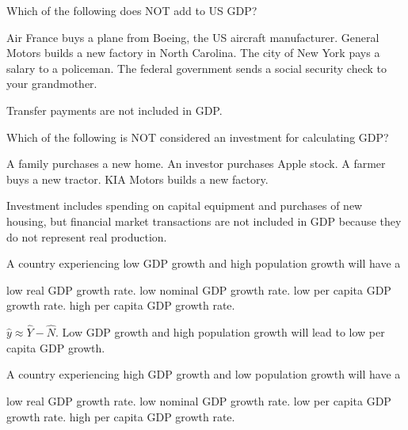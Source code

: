 \documentclass[addpoints,11pt]{exam}
\theoremstyle{definition}
\begin{document}
\begin{questions}

		\question Which of the following does NOT add to US GDP?
		
		\begin{choices}
			\choice Air France buys a plane from Boeing, the US aircraft manufacturer.
			\choice General Motors builds a new factory in North Carolina.
			\choice The city of New York pays a salary to a policeman.
			\CorrectChoice The federal government sends a social security check to your grandmother.
		\end{choices}
		
		\begin{solution}
			Transfer payments are not included in GDP.
		\end{solution}
	
\newpage
		
		\question Which of the following is NOT considered an investment for calculating GDP?
		
		\begin{choices}
			\choice A family purchases a new home.
			\CorrectChoice An investor purchases Apple stock.
			\choice A farmer buys a new tractor.
			\choice KIA Motors builds a new factory.
		\end{choices}
		
		\begin{solution}
			Investment includes spending on capital equipment and purchases of new housing, but financial market transactions are not included in GDP because they do not represent real production.
		\end{solution}
		
		\question A country experiencing low GDP growth and high population growth will have a
		
		\begin{choices}
			\choice low real GDP growth rate.
			\choice low nominal GDP growth rate.
			\CorrectChoice low per capita GDP growth rate.
			\choice high per capita GDP growth rate.
		\end{choices}
		
		\begin{solution}
			$\hat{y} \approx \hat{Y} - \hat{N}$. Low GDP growth and high population growth will lead to low per capita GDP growth.
		\end{solution}

	\question A country experiencing high GDP growth and low population growth will have a
	
	\begin{choices}
		\choice low real GDP growth rate.
		\choice low nominal GDP growth rate.
		\choice low per capita GDP growth rate.
		\CorrectChoice high per capita GDP growth rate.
	\end{choices}
	

\end{questions}
\end{document}
